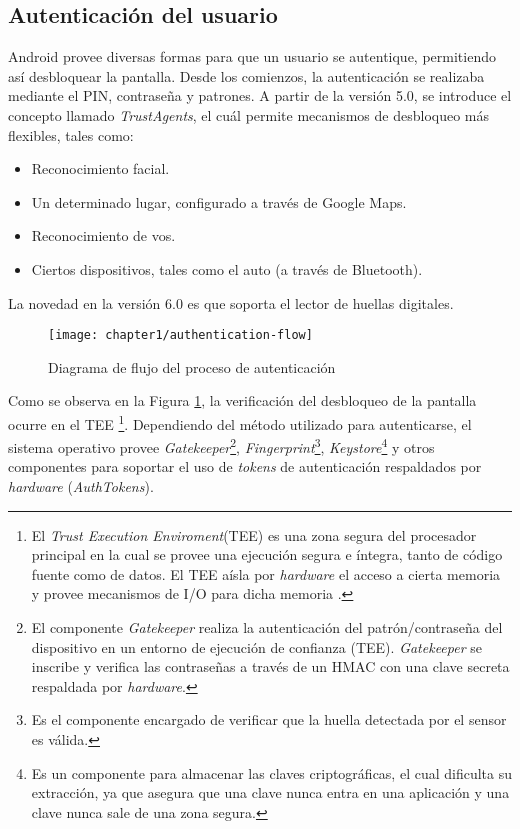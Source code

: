 \subsection{Autenticaci\'on del usuario}
Android provee diversas formas para que un usuario se autentique, permitiendo así desbloquear la pantalla. Desde los comienzos, la autenticaci\'on se realizaba mediante el PIN, contraseña y patrones. A partir de la versión 5.0, se introduce el concepto llamado \textit{TrustAgents}, el cuál permite mecanismos de desbloqueo más flexibles, tales como:
\begin{itemize}
	\item Reconocimiento facial.
	\item Un determinado lugar, configurado a través de Google Maps.
	\item Reconocimiento de vos.
	\item Ciertos dispositivos, tales como el auto (a través de Bluetooth).
\end{itemize}
La novedad en la versión 6.0 es que soporta el lector de huellas digitales.\\
\begin{figure}[!ht]
	\begin{center}
		\texttt{[image: chapter1/authentication-flow]}
		\caption{Diagrama de flujo del proceso de autenticaci\'on \cite{aossec}}
		\label{fig:ch01:authentication-flow}
	\end{center}
\end{figure}
Como se observa en la Figura \ref{fig:ch01:authentication-flow}, la verificación del desbloqueo de la pantalla ocurre en el TEE \footnote{El \textit{Trust Execution Enviroment}(TEE) es una zona segura del procesador principal en la cual se provee una ejecución segura e íntegra, tanto de código fuente como de datos. El TEE aísla por \textit{hardware} el acceso a cierta memoria y provee mecanismos de I/O para dicha memoria \cite{tee2011}.}.
Dependiendo del método utilizado para autenticarse, el sistema operativo provee \textit{Gatekeeper}\footnote{El componente \textit{Gatekeeper} realiza la autenticación del patrón/contraseña del dispositivo en un entorno de ejecución de confianza (TEE). \textit{Gatekeeper} se inscribe y verifica las contraseñas a través de un HMAC con una clave secreta respaldada por \textit{hardware}.}, \textit{Fingerprint}\footnote{Es el componente encargado de verificar que la huella detectada por el sensor es v\'alida.}, \textit{Keystore}\footnote{Es un componente para almacenar las claves criptográficas, el cual dificulta su extracción, ya que asegura que una clave nunca entra en una aplicación y una clave nunca sale de una zona segura.\cite{dakss}} y otros componentes para soportar el uso de \textit{tokens} de autenticación respaldados por \textit{hardware} (\textit{AuthTokens}).\\
